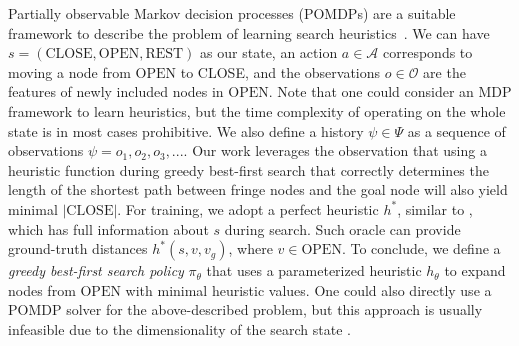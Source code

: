  Partially observable Markov decision processes (POMDPs) are a suitable framework to describe the problem of learning search heuristics~\cite{bhardwaj2017learning}. We can have $s = (\text{CLOSE}, \text{OPEN}, \text{REST})$ as our state, an action $a \in \mathcal{A}$ corresponds to moving a node from $\text{OPEN}$ to CLOSE, and the observations $o \in \mathcal{O}$ are the features of newly included nodes in $\text{OPEN}$. Note that one could consider an MDP framework to learn heuristics, but the time complexity of operating on the whole state is in most cases prohibitive. We also define a history $\psi \in \Psi$ as a sequence of observations $\psi = o_1, o_2, o_3, ...$. Our work leverages the observation that using a heuristic function during greedy best-first search that correctly determines the length of the shortest path between fringe nodes and the goal node will also yield minimal $|\text{CLOSE}|$. For training, we adopt a perfect heuristic $h^{*}$, similar to \cite{bhardwaj2017learning}, which has full information about $s$ during search. Such oracle can provide ground-truth distances $h^{*}(s, v, v_g)$, where $v \in \text{OPEN}$. To conclude, we define a \textit{greedy best-first search policy} $\pi_{\theta}$ that uses a parameterized heuristic $h_{\theta}$ to expand nodes from $\text{OPEN}$ with minimal heuristic values. One could also directly use a POMDP solver for the above-described problem, but this approach is usually infeasible due to the dimensionality of the search state \cite{choudhury2017adaptive}.


